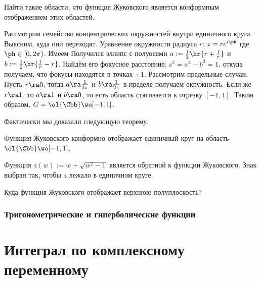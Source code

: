 \documentclass[a4paper]{article}
\begin{document}
\begin{solution}
\begin{problem}
Найти такие области, что функция Жуковского является конформным отображением этих областей.
\end{problem}
\begin{solution}
Рассмотрим семейство концентрических окружностей внутри единичного круга. Выясним, куда они переходят.
Уравнение окружности радиуса $r$: $z = re^{i\ph}$ где $\ph \in [0,2\pi)$. Имеем
Получился эллипс  с полуосями $a := \frac12\hr{r + \frac{1}{r}}$ и $b := \frac12\hr{\frac{1}{r} - r}$.
Найдём его фокусное расстояние: $c^2 = a^2 - b^2 = 1$, откуда получаем, что фокусы находятся в точках
$\pm 1$. Рассмотрим предельные случаи. Пусть $r \ra 0$, тогда $a \ra \frac{1}{2\pi}$ и $b \ra \frac{1}{2\pi}$\т
в пределе получаем окружность. Если же $r \ra 1$, то $a \ra 1$ и $b \ra 0$, то есть область стягивается к отрезку $[-1,1]$.
Таким образом, $G = \ol{\Cbb} \wo [-1,1]$.
\end{solution}

Фактически мы доказали следующую теорему.

\begin{theorem}
Функция Жуковского конформно отображает единичный круг на область $\ol{\Cbb} \wo [-1,1]$.
\end{theorem}

Функция $z(w) := w + \sqrt{w^2 - 1}$ является обратной к функции Жуковского. Знак выбран так, чтобы $z$ лежало
в единичном круге.

\begin{problem}
Куда функция Жуковского отображает верхнюю полуплоскость?
\end{problem}

\subsubsection{Тригонометрические и гиперболические функции}

\begin{df}
\end{df}

\begin{df}
\end{df}

\section{Интеграл по комплексному переменному}


\end{solution}
\end{document}
